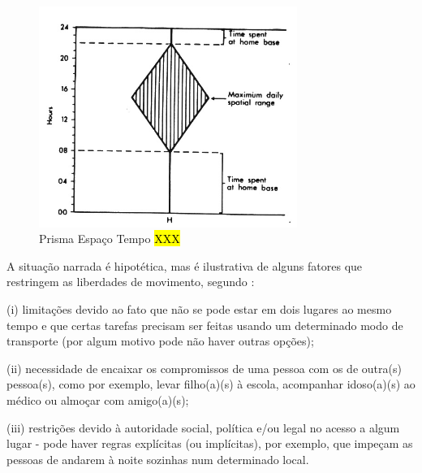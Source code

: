 \begin{figure}[htb]%
    \caption{\label{fig:prisma}Prisma Espaço Tempo \hl{XXX} }%
    \begin{center}%
        \includegraphics[width=0.75\textwidth]{./imagens/timeprism.jpg}%
    \end{center}%
\end{figure}%

A situação narrada é hipotética, mas é ilustrativa de alguns fatores que restringem as liberdades de movimento, segundo :
\begin{compactitem}
\item (i) limitações devido ao fato que não se pode estar em dois lugares ao mesmo tempo e que certas tarefas precisam ser feitas usando um determinado modo de transporte (por algum motivo pode não haver outras opções);
\item (ii) necessidade de encaixar os compromissos de uma pessoa com os de outra(s) pessoa(s), como por exemplo, levar filho(a)(s) à escola, acompanhar idoso(a)(s) ao médico ou almoçar com amigo(a)(s);
\item (iii) restrições devido à autoridade social, política e/ou legal no acesso a algum lugar - pode haver regras explícitas (ou implícitas), por exemplo, que impeçam as pessoas de andarem à noite sozinhas num determinado local.
\end{compactitem}

